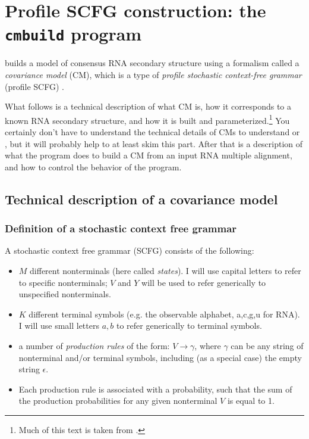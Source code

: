 \section{Profile SCFG construction: the \texttt{cmbuild} program}

 builds a model of consensus RNA secondary
structure using a formalism called a \emph{covariance model} (CM),
which is a type of \emph{profile stochastic context-free grammar}
(profile SCFG) \cite{Eddy94,Durbin98,Eddy02b}.

What follows is a technical description of what CM is, how it
corresponds to a known RNA secondary structure, and how it is built
and parameterized.\footnote{Much of this text is taken from
\cite{Eddy02b}.}  You certainly don't have to understand the technical
details of CMs to understand  or ,
but it will probably help to at least skim this part. After that is a
description of what the  program does to build a CM from
an input RNA multiple alignment, and how to control the behavior of
the program.

\subsection{Technical description of a covariance model}

\subsubsection{Definition of a stochastic context free grammar}

A stochastic context free grammar (SCFG) consists of the following:

\begin{itemize}
\item $M$ different nonterminals (here called \emph{states}). I will use capital
      letters to refer to specific nonterminals; $V$ and $Y$ will be used
      to refer generically to unspecified nonterminals.
\item $K$ different terminal symbols (e.g. the observable alphabet,
      {a,c,g,u} for RNA). I will use small letters $a,b$ to refer
      generically to terminal symbols.
\item a number of \emph{production rules} of the form: $V \rightarrow
\gamma$, where $\gamma$ can be any string of nonterminal and/or
terminal symbols, including (as a special case) the empty string
$\epsilon$.
\item Each production rule is associated with a probability, such that
      the sum of the production probabilities for any given
      nonterminal $V$ is equal to 1.
\end{itemize} 

